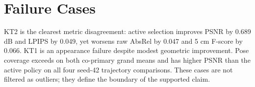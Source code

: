 \begin{table}[h]
  \centering
  \caption{Complete prespecified active-minus-random outcome summary.  SD is
  the population standard deviation over eight pairs; Fav. is the count in the
  metric's favorable direction; intervals resample trajectory clusters.}
  
\end{table}

\section{Failure Cases}
KT2 is the clearest metric disagreement: active selection improves PSNR by
0.689 dB and LPIPS by 0.049, yet worsens raw AbsRel by 0.047 and 5 cm F-score by
0.066.  KT1 is an appearance failure despite modest geometric improvement.
Pose coverage exceeds \method{} on both co-primary grand means and has higher
PSNR than the active policy on all four seed-42 trajectory comparisons.  These
cases are not filtered as outliers; they define the boundary of the supported
claim.
